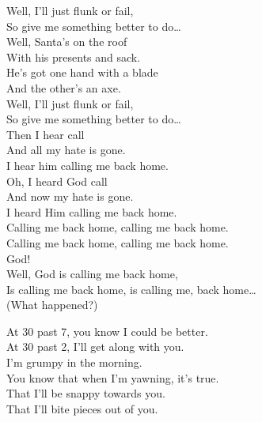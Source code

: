 Well, I'll just flunk or fail, \\
So give me something better to do… \\

Well, Santa's on the roof \\
With his presents and sack. \\
He's got one hand with a blade \\
And the other's an axe. \\

Well, I'll just flunk or fail, \\
So give me something better to do… \\

Then I hear  call \\
And all my hate is gone. \\
I hear him calling me back home. \\

Oh, I heard God call \\
And now my hate is gone. \\
I heard Him calling me back home. \\

Calling me back home, calling me back home. \\
Calling me back home, calling me back home. \\

God! \\

Well, God is calling me back home, \\
Is calling me back home, is calling me, back home… \\

(What happened?) \\





At 30 past 7, you know I could be better. \\
At 30 past 2, I'll get along with you. \\
I'm grumpy in the morning. \\
You know that when I'm yawning, it's true. \\

That I'll be snappy towards you. \\
That I'll bite pieces out of you. \\


